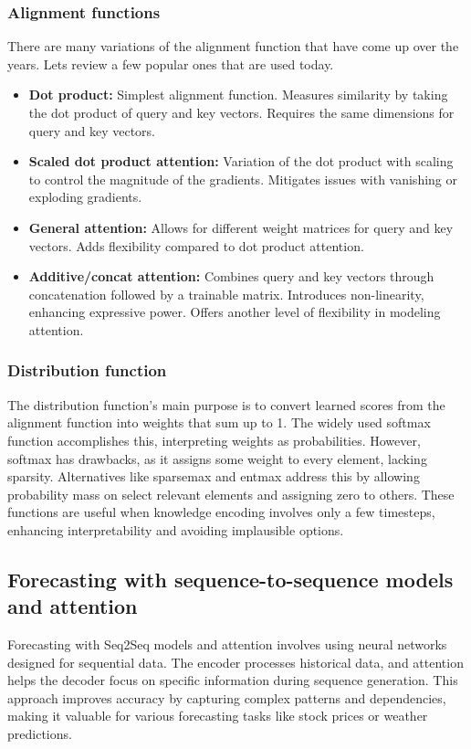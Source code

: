 \documentclass{article}
\begin{document}
\subsubsection{Alignment functions}
There are many variations of the alignment function that have come up over the years. Lets review a
few popular ones that are used today.
\begin{itemize}
    \item \textbf{Dot product:} Simplest alignment function. Measures similarity by taking the dot product of query and key vectors. Requires the same dimensions for query and key vectors.
    \item \textbf{Scaled dot product attention:} Variation of the dot product with scaling to control the magnitude of the gradients. Mitigates issues with vanishing or exploding gradients.
    \item \textbf{General attention:} Allows for different weight matrices for query and key vectors. Adds flexibility compared to dot product attention.
    \item \textbf{Additive/concat attention:} Combines query and key vectors through concatenation followed by a trainable matrix. Introduces non-linearity, enhancing expressive power. Offers another level of flexibility in modeling attention.

\end{itemize}

\subsubsection{Distribution function}
The distribution function's main purpose is to convert learned scores from the alignment function into weights that sum up to 1. The widely used softmax function accomplishes this, interpreting weights as probabilities. However, softmax has drawbacks, as it assigns some weight to every element, lacking sparsity. Alternatives like sparsemax and entmax address this by allowing probability mass on select relevant elements and assigning zero to others. These functions are useful when knowledge encoding involves only a few timesteps, enhancing interpretability and avoiding implausible options.
\subsection{Forecasting with sequence-to-sequence models and attention}
Forecasting with Seq2Seq models and attention involves using neural networks designed for sequential data. The encoder processes historical data, and attention helps the decoder focus on specific information during sequence generation. This approach improves accuracy by capturing complex patterns and dependencies, making it valuable for various forecasting tasks like stock prices or weather predictions.
\end{document}
